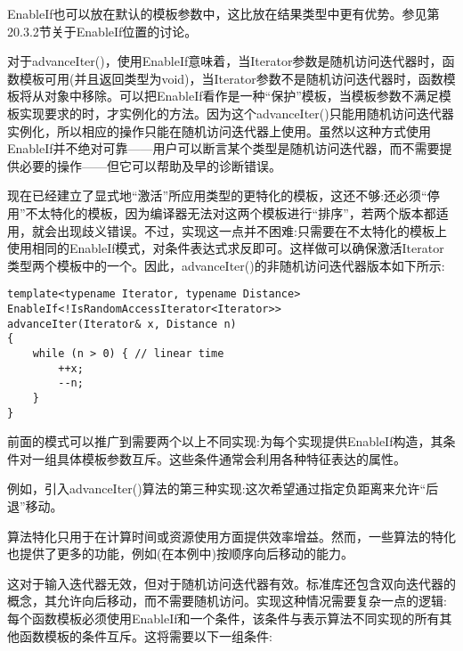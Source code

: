 \begin{tcolorbox}[colback=webgreen!5!white,colframe=webgreen!75!black]
\hspace*{0.75cm}EnableIf也可以放在默认的模板参数中，这比放在结果类型中更有优势。参见第20.3.2节关于EnableIf位置的讨论。
\end{tcolorbox}

对于advanceIter()，使用EnableIf意味着，当Iterator参数是随机访问迭代器时，函数模板可用(并且返回类型为void)，当Iterator参数不是随机访问迭代器时，函数模板将从对象中移除。可以把EnableIf看作是一种“保护”模板，当模板参数不满足模板实现要求的时，才实例化的方法。因为这个advanceIter()只能用随机访问迭代器实例化，所以相应的操作只能在随机访问迭代器上使用。虽然以这种方式使用EnableIf并不绝对可靠——用户可以断言某个类型是随机访问迭代器，而不需要提供必要的操作——但它可以帮助及早的诊断错误。

现在已经建立了显式地“激活”所应用类型的更特化的模板，这还不够:还必须“停用”不太特化的模板，因为编译器无法对这两个模板进行“排序”，若两个版本都适用，就会出现歧义错误。不过，实现这一点并不困难:只需要在不太特化的模板上使用相同的EnableIf模式，对条件表达式求反即可。这样做可以确保激活Iterator类型两个模板中的一个。因此，advanceIter()的非随机访问迭代器版本如下所示:

\begin{lstlisting}[style=styleCXX]
template<typename Iterator, typename Distance>
EnableIf<!IsRandomAccessIterator<Iterator>>
advanceIter(Iterator& x, Distance n)
{
	while (n > 0) { // linear time
		++x;
		--n;
	}
}
\end{lstlisting}


前面的模式可以推广到需要两个以上不同实现:为每个实现提供EnableIf构造，其条件对一组具体模板参数互斥。这些条件通常会利用各种特征表达的属性。

例如，引入advanceIter()算法的第三种实现:这次希望通过指定负距离来允许“后退”移动。

\begin{tcolorbox}[colback=webgreen!5!white,colframe=webgreen!75!black]
\hspace*{0.75cm}算法特化只用于在计算时间或资源使用方面提供效率增益。然而，一些算法的特化也提供了更多的功能，例如(在本例中)按顺序向后移动的能力。
\end{tcolorbox}

这对于输入迭代器无效，但对于随机访问迭代器有效。标准库还包含双向迭代器的概念，其允许向后移动，而不需要随机访问。实现这种情况需要复杂一点的逻辑:每个函数模板必须使用EnableIf和一个条件，该条件与表示算法不同实现的所有其他函数模板的条件互斥。这将需要以下一组条件:

